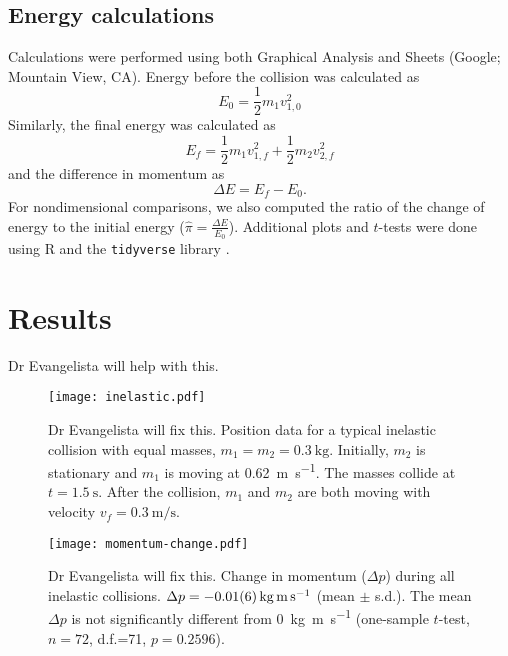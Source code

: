 \documentclass[aps,prl,reprint]{revtex4-1}
\begin{document}
 \subsection{Energy calculations}
 Calculations were performed using both Graphical Analysis and Sheets (Google; Mountain View, CA). 
 Energy before the collision was calculated as
 \begin{equation}
E_0 = \frac{1}{2} m_1 v_{1,0}^2
 \end{equation}
Similarly, the final energy was calculated as
 \begin{equation}
E_f = \frac{1}{2} m_1 v_{1,f}^2 + \frac{1}{2} m_2 v_{2,f}^2
 \end{equation}
and the difference in momentum as 
 \begin{equation}
\Delta E =  E_f - E_0. 
 \end{equation}
For nondimensional comparisons, we also computed the ratio of the change of energy to the initial energy ($\hat{\pi}=\frac{\Delta E}{E_0}$). Additional plots and $t$-tests were done using R \cite{r-2021} and the \lstinline{tidyverse} library \cite{wickham-2019-welcome}. 

\section{Results}
Dr Evangelista will help with this. 

\begin{figure}
\begin{center}
\texttt{[image: inelastic.pdf]}
\end{center}
\caption{Dr Evangelista will fix this. Position data for a typical inelastic collision with equal masses, $m_1=m_2=\SI{0.3}{\kilo\gram}$. Initially, $m_2$ is stationary and $m_1$ is moving at \SI{0.62}{\meter\per\second}. The masses collide at $t=\SI{1.5}{\second}$. After the collision, $m_1$ and $m_2$ are both moving with velocity $v_f=\SI{0.3}{\meter\per\second}$. }
\label{fig:results1}
\end{figure}

\begin{figure}
\begin{center}
\texttt{[image: momentum-change.pdf]}
\end{center}
\caption{Dr Evangelista will fix this. Change in momentum ($\Delta p$) during all inelastic collisions. $\Delta p = \SI{-0.01\pm0.06}{\kilo\gram\meter\per\second}$ (mean $\pm$ s.d.). The mean $\Delta p$ is not significantly different from \SI{0}{\kilo\gram\meter\per\second} (one-sample $t$-test, $n=72$, d.f.=71, $p=0.2596$).}
\label{fig:results2}
\end{figure}
\end{document}

